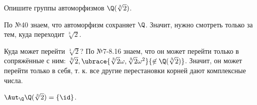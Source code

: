 \begin{problem}[42 (10.5)]
Опишите группы автоморфизмов $\Q(\sqrt[3]{2})$.
\end{problem}
\begin{solution}
По №40 знаем, что автоморфизм сохраняет $\Q$. Значит, нужно смотреть только за тем, куда переходит $\sqrt[3]{2}$.

Куда может перейти $\sqrt[3]{2}$? По №7-8.16 знаем, что он может перейти только в сопряжённые с ним: $\sqrt[3]{2}, \ubrace{\sqrt[3]{2}\omega, \sqrt[3]{2}\omega^2}{\not\in \Q(\sqrt[3]{2})}$. Значит, он может перейти только в себя, т. к. все другие перестановки корней дают комплексные числа. 

\(\Aut_\Q \Q(\sqrt[3]{2}) = \{\id\}\).



\end{solution}

